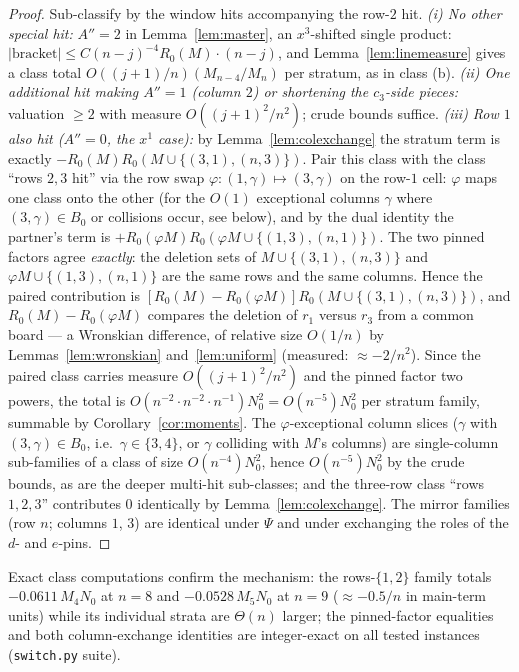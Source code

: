 \documentclass[11pt]{article}
\theoremstyle{definition}
\begin{document}
\begin{proof}
Sub-classify by the window hits accompanying the row-$2$ hit.
\emph{(i) No other special hit:} $A''=2$ in Lemma~\ref{lem:master}, an
$x^3$-shifted single product: $|\mathrm{bracket}|\le C(n-j)^{-4}
R_0(M)\cdot(n-j)$, and Lemma~\ref{lem:linemeasure} gives a class total
$O((j{+}1)/n)(M_{n-4}/M_n)$ per stratum, as in class (b).
\emph{(ii) One additional hit making $A''=1$ (column $2$) or shortening
the $c_3$-side pieces:} valuation $\ge2$ with measure
$O((j{+}1)^2/n^2)$; crude bounds suffice.
\emph{(iii) Row $1$ also hit ($A''=0$, the $x^1$ case):} by
Lemma~\ref{lem:colexchange} the stratum term is exactly
$-R_0(M)R_0(M\cup\{(3,1),(n,3)\})$.  Pair this class with the class
``rows $2,3$ hit'' via the row swap $\varphi:(1,\gamma)\mapsto
(3,\gamma)$ on the row-$1$ cell: $\varphi$ maps one class onto the
other (for the $O(1)$ exceptional columns $\gamma$ where $(3,\gamma)\in
B_0$ or collisions occur, see below), and by the dual identity the
partner's term is $+R_0(\varphi M)R_0(\varphi M\cup\{(1,3),(n,1)\})$.
The two pinned factors agree \emph{exactly}: the deletion sets of
$M\cup\{(3,1),(n,3)\}$ and $\varphi M\cup\{(1,3),(n,1)\}$ are the same
rows and the same columns.  Hence the paired contribution is
$[R_0(M)-R_0(\varphi M)]R_0(M\cup\{(3,1),(n,3)\})$, and
$R_0(M)-R_0(\varphi M)$ compares the deletion of $r_1$ versus $r_3$
from a common board --- a Wronskian difference, of relative size
$O(1/n)$ by Lemmas~\ref{lem:wronskian} and~\ref{lem:uniform} (measured:
$\approx-2/n^2$).  Since the paired class carries measure
$O((j{+}1)^2/n^2)$ and the pinned factor two powers, the total is
$O(n^{-2}\cdot n^{-2}\cdot n^{-1})N_0^2=O(n^{-5})N_0^2$ per stratum
family, summable by Corollary~\ref{cor:moments}.  The
$\varphi$-exceptional column slices ($\gamma$ with $(3,\gamma)\in B_0$,
i.e.\ $\gamma\in\{3,4\}$, or $\gamma$ colliding with $M$'s columns) are
single-column sub-families of a class of size $O(n^{-4})N_0^2$, hence
$O(n^{-5})N_0^2$ by the crude bounds, as are the deeper multi-hit
sub-classes; and the three-row class ``rows $1,2,3$'' contributes $0$
identically by Lemma~\ref{lem:colexchange}.  The mirror families (row
$n$; columns $1$, $3$) are identical under $\Psi$ and under exchanging
the roles of the $d$- and $e$-pins.
\end{proof}

\noindent
Exact class computations confirm the mechanism: the rows-$\{1,2\}$
family totals $-0.0611\,M_4N_0$ at $n=8$ and $-0.0528\,M_5N_0$ at $n=9$
($\approx-0.5/n$ in main-term units) while its individual strata are
$\Theta(n)$ larger; the pinned-factor equalities and both column-exchange
identities are integer-exact on all tested instances
(\texttt{switch.py} suite).
\end{document}
